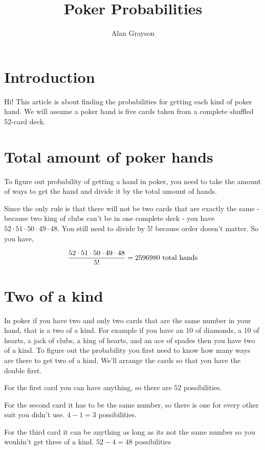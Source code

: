 \documentclass[12pt]{article}
\begin{document}
\title{Poker Probabilities}
\author{Alan Grayson}
\maketitle

\section*{Introduction}

Hi! This article is about finding the probabilities for getting each kind of poker hand.
We will assume a poker hand is five cards taken from a complete shuffled 52-card deck.
\section{Total amount of poker hands}
To figure out probability of getting a hand in poker, you need to take the amount of ways to get the hand and divide it by the total amount of hands.

Since the only rule is that there will not be two cards that are
exactly the same - because two king of clubs can't be in one complete
deck - you have $52 \cdot 51 \cdot 50 \cdot 49 \cdot 48$.  You still
need to divide by 5! because order doesn't matter. So you have,


\begin{equation}
{52 \cdot 51 \cdot 50 \cdot 49 \cdot 48 \over 5!} = 2596980 \hbox{ total hands}
\end{equation}
\section{Two of a kind}

In poker if you have two and only two cards that are the same number in your hand, that is a two of a kind.
For example if you have an 10 of diamonds, a 10 of hearts, a jack of clubs, a king of hearts, and an ace of spades then you have two of a kind.
To figure out the probability you first need to know how many ways are there to get two of a kind.
We'll arrange the cards so that you have the double first.

For the first card you can have anything, so there are $52$ possibilities.

For the second card it has to be the same number, so there is one for every other suit you didn't use. $4 - 1 = 3$ possibilities.

For the third card it can be anything as long as its not the same number so you wouldn't get three of a kind. $52 - 4 = 48$ possibilities
\end{document}
